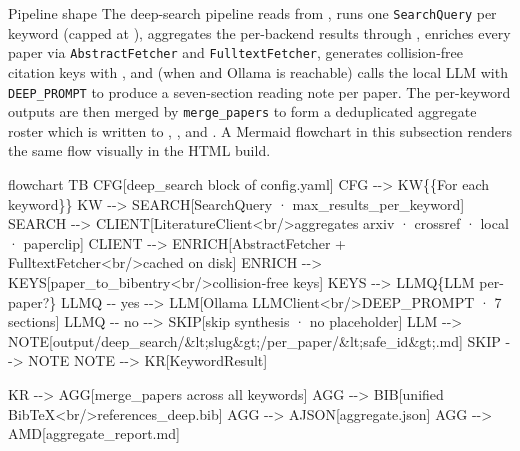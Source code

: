 \documentclass[
  ignorenonframetext,
]{beamer}
\newenvironment{Shaded}{}{}
\newcommand{\NormalTok}[1]{#1}
\begin{document}
\begin{frame}{Pipeline shape}
\protect{}\label{pipeline-shape}
The deep-search pipeline reads 
from , runs one \texttt{SearchQuery} per
keyword (capped at ), aggregates the
per-backend results through , enriches every
paper via \texttt{AbstractFetcher} and \texttt{FulltextFetcher},
generates collision-free citation keys with
, and (when 
and Ollama is reachable) calls the local LLM with \texttt{DEEP\_PROMPT}
to produce a seven-section reading note per paper. The per-keyword
outputs are then merged by \texttt{merge\_papers} to form a deduplicated
aggregate roster which is written to
,
, and
. A Mermaid flowchart
in this subsection renders the same flow visually in the HTML build.

\begin{Shaded}
\begin{Highlighting}[]
\NormalTok{flowchart TB}
\NormalTok{    CFG[deep\_search block of config.yaml]}
\NormalTok{    CFG {-}{-}\textgreater{} KW\{\{For each keyword\}\}}
\NormalTok{    KW {-}{-}\textgreater{} SEARCH[SearchQuery · max\_results\_per\_keyword]}
\NormalTok{    SEARCH {-}{-}\textgreater{} CLIENT[LiteratureClient\textless{}br/\textgreater{}aggregates arxiv · crossref · local · paperclip]}
\NormalTok{    CLIENT {-}{-}\textgreater{} ENRICH[AbstractFetcher + FulltextFetcher\textless{}br/\textgreater{}cached on disk]}
\NormalTok{    ENRICH {-}{-}\textgreater{} KEYS[paper\_to\_bibentry\textless{}br/\textgreater{}collision{-}free keys]}
\NormalTok{    KEYS {-}{-}\textgreater{} LLMQ\{LLM per{-}paper?\}}
\NormalTok{    LLMQ {-}{-} yes {-}{-}\textgreater{} LLM[Ollama LLMClient\textless{}br/\textgreater{}DEEP\_PROMPT · 7 sections]}
\NormalTok{    LLMQ {-}{-} no {-}{-}\textgreater{} SKIP[skip synthesis · no placeholder]}
\NormalTok{    LLM {-}{-}\textgreater{} NOTE[output/deep\_search/\&lt;slug\&gt;/per\_paper/\&lt;safe\_id\&gt;.md]}
\NormalTok{    SKIP {-}{-}\textgreater{} NOTE}
\NormalTok{    NOTE {-}{-}\textgreater{} KR[KeywordResult]}

\NormalTok{    KR {-}{-}\textgreater{} AGG[merge\_papers across all keywords]}
\NormalTok{    AGG {-}{-}\textgreater{} BIB[unified BibTeX\textless{}br/\textgreater{}references\_deep.bib]}
\NormalTok{    AGG {-}{-}\textgreater{} AJSON[aggregate.json]}
\NormalTok{    AGG {-}{-}\textgreater{} AMD[aggregate\_report.md]}


\end{Highlighting}
\end{Shaded}
\end{frame}
\end{document}
